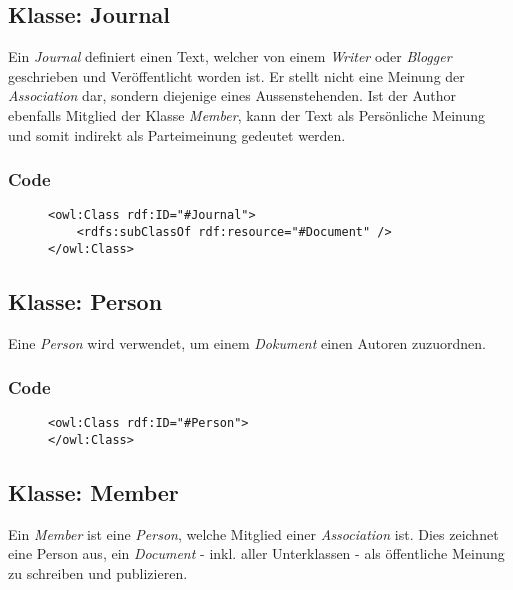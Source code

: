 \documentclass[
    11pt,
    latin1,
    a4paper,
    oneside
]{scrreprt}
\begin{document}
\subsection{Klasse: Journal} \label{sec:class_journal}

Ein \emph{Journal} definiert einen Text, welcher von einem \emph{Writer} oder \emph{Blogger} geschrieben und Ver\"offentlicht worden ist. Er stellt nicht eine Meinung der \emph{Association} dar, sondern diejenige eines Aussenstehenden. Ist der Author ebenfalls Mitglied der Klasse \emph{Member}, kann der Text als Pers\"onliche Meinung und somit indirekt als Parteimeinung gedeutet werden.

\subsubsection{Code} \label{sec:class_journal_code}

\begin{figure}[h]
 \lstset{language=XML}
 \begin{lstlisting}[label=owl:word]
<owl:Class rdf:ID="#Journal">
	<rdfs:subClassOf rdf:resource="#Document" />
</owl:Class>
 \end{lstlisting}
\end{figure}

\subsection{Klasse: Person} \label{sec:class_person}

Eine \emph{Person} wird verwendet, um einem \emph{Dokument} einen Autoren zuzuordnen.

\subsubsection{Code} \label{sec:class_person_code}

\begin{figure}[h]
 \lstset{language=XML}
 \begin{lstlisting}[label=owl:word]
<owl:Class rdf:ID="#Person">
</owl:Class>
 \end{lstlisting}
\end{figure}

\subsection{Klasse: Member} \label{sec:class_member}

Ein \emph{Member} ist eine \emph{Person}, welche Mitglied einer \emph{Association} ist. Dies zeichnet eine Person aus, ein \emph{Document} - inkl. aller Unterklassen - als \"offentliche Meinung zu schreiben und publizieren.
\end{document}
